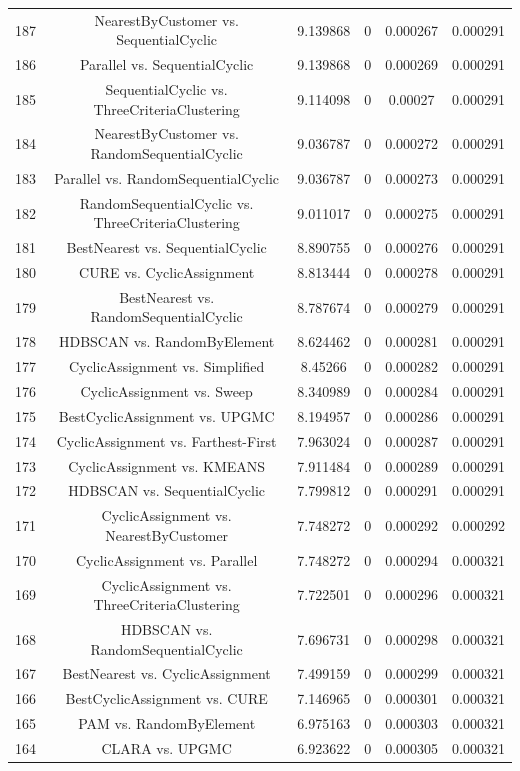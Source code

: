 \documentclass[a4paper,10pt]{article}
\begin{document}
\begin{landscape}
\begin{table}[!htp]
\begin{tabular}{cccccc}
187&NearestByCustomer vs. SequentialCyclic&9.139868&0&0.000267&0.000291\\
186&Parallel vs. SequentialCyclic&9.139868&0&0.000269&0.000291\\
185&SequentialCyclic vs. ThreeCriteriaClustering&9.114098&0&0.00027&0.000291\\
184&NearestByCustomer vs. RandomSequentialCyclic&9.036787&0&0.000272&0.000291\\
183&Parallel vs. RandomSequentialCyclic&9.036787&0&0.000273&0.000291\\
182&RandomSequentialCyclic vs. ThreeCriteriaClustering&9.011017&0&0.000275&0.000291\\
181&BestNearest vs. SequentialCyclic&8.890755&0&0.000276&0.000291\\
180&CURE vs. CyclicAssignment&8.813444&0&0.000278&0.000291\\
179&BestNearest vs. RandomSequentialCyclic&8.787674&0&0.000279&0.000291\\
178&HDBSCAN vs. RandomByElement&8.624462&0&0.000281&0.000291\\
177&CyclicAssignment vs. Simplified&8.45266&0&0.000282&0.000291\\
176&CyclicAssignment vs. Sweep&8.340989&0&0.000284&0.000291\\
175&BestCyclicAssignment vs. UPGMC&8.194957&0&0.000286&0.000291\\
174&CyclicAssignment vs. Farthest-First&7.963024&0&0.000287&0.000291\\
173&CyclicAssignment vs. KMEANS&7.911484&0&0.000289&0.000291\\
172&HDBSCAN vs. SequentialCyclic&7.799812&0&0.000291&0.000291\\
171&CyclicAssignment vs. NearestByCustomer&7.748272&0&0.000292&0.000292\\
170&CyclicAssignment vs. Parallel&7.748272&0&0.000294&0.000321\\
169&CyclicAssignment vs. ThreeCriteriaClustering&7.722501&0&0.000296&0.000321\\
168&HDBSCAN vs. RandomSequentialCyclic&7.696731&0&0.000298&0.000321\\
167&BestNearest vs. CyclicAssignment&7.499159&0&0.000299&0.000321\\
166&BestCyclicAssignment vs. CURE&7.146965&0&0.000301&0.000321\\
165&PAM vs. RandomByElement&6.975163&0&0.000303&0.000321\\
164&CLARA vs. UPGMC&6.923622&0&0.000305&0.000321\\

\end{tabular}
\end{table}
\end{landscape}
\end{document}
